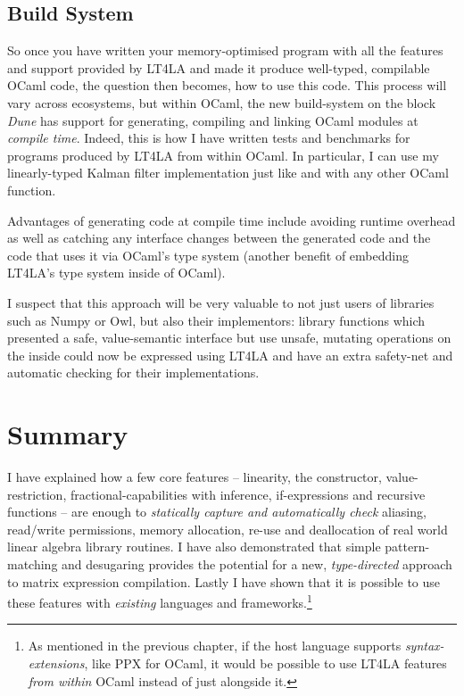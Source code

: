 \subsection{Build System}

So once you have written your memory-optimised program with all the features
and support provided by LT4LA and made it produce well-typed, compilable OCaml
code, the question then becomes, how to use this code. This process will vary
across ecosystems, but within OCaml, the new build-system on the block
\emph{Dune} has support for generating, compiling and linking OCaml modules at
\emph{compile time}. Indeed, this is how I have written tests and benchmarks
for programs produced by LT4LA from within OCaml. In particular, I can use my
linearly-typed Kalman filter implementation just like and with any other OCaml
function.

Advantages of generating code at compile time include avoiding runtime overhead
as well as catching any interface changes between the generated code and the
code that uses it via OCaml's type system (another benefit of embedding LT4LA's
type system inside of OCaml).

I suspect that this approach will be very valuable to not just users of
libraries such as Numpy or Owl, but also their implementors: library functions
which presented a safe, value-semantic interface but use unsafe, mutating
operations on the inside could now be expressed using LT4LA and have an extra
safety-net and automatic checking for their implementations.

\section{Summary}

I have explained how a few core features -- linearity, the 
constructor, value-restriction, fractional-capabilities with inference,
if-expressions and recursive functions -- are enough to \emph{statically
capture and automatically check} aliasing, read/write permissions, memory
allocation, re-use and deallocation of real world linear algebra library
routines. I have also demonstrated that simple pattern-matching and desugaring
provides the potential for a new, \emph{type-directed} approach to matrix
expression compilation. Lastly I have shown that it is possible to use these
features with \emph{existing} languages and frameworks.\footnote{As mentioned
in the previous chapter, if the host language supports
\emph{syntax-extensions}, like PPX for OCaml, it would be possible to use LT4LA
features \emph{from within} OCaml instead of just alongside it.}

